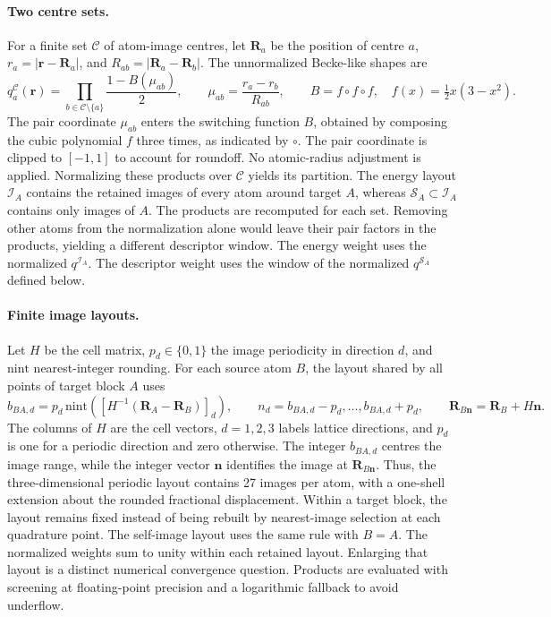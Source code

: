 \documentclass[10pt,a4paper]{article}
\begin{document}
\paragraph{Two centre sets.}
For a finite set $\mathcal C$ of atom-image centres, let $\mathbf R_a$ be the position of centre $a$, $r_a=|\mathbf r-\mathbf R_a|$, and $R_{ab}=|\mathbf R_a-\mathbf R_b|$. The unnormalized Becke-like shapes are
\begin{equation}
 q_a^{\mathcal C}(\mathbf r)=\prod_{b\in\mathcal C\setminus\{a\}}
 \frac{1-B(\mu_{ab})}{2},\qquad
 \mu_{ab}=\frac{r_a-r_b}{R_{ab}},\qquad
 B=f\circ f\circ f,\quad f(x)=\tfrac12x(3-x^2).
 \label{eq:partition-shapes}
\end{equation}
The pair coordinate $\mu_{ab}$ enters the switching function $B$, obtained by composing the cubic polynomial $f$ three times, as indicated by $\circ$.
The pair coordinate is clipped to $[-1,1]$ to account for roundoff. No atomic-radius adjustment is applied. Normalizing these products over $\mathcal C$ yields its partition. The energy layout $\mathcal I_A$ contains the retained images of every atom around target $A$, whereas $\mathcal S_A\subset\mathcal I_A$ contains only images of $A$. The products are recomputed for each set. Removing other atoms from the normalization alone would leave their pair factors in the products, yielding a different descriptor window. The energy weight uses the normalized $q^{\mathcal I_A}$. The descriptor weight uses the window of the normalized $q^{\mathcal S_A}$ defined below.

\paragraph{Finite image layouts.}
Let $H$ be the cell matrix, $p_d\in\{0,1\}$ the image periodicity in direction $d$, and $\mathrm{nint}$ nearest-integer rounding. For each source atom $B$, the layout shared by all points of target block $A$ uses
\begin{equation}
 b_{BA,d}=p_d\,\mathrm{nint}\!\left([H^{-1}(\mathbf R_A-\mathbf R_B)]_d\right),
 \qquad n_d=b_{BA,d}-p_d,\ldots,b_{BA,d}+p_d,
 \qquad \mathbf R_{B\mathbf n}=\mathbf R_B+H\mathbf n.
 \label{eq:partition-images}
\end{equation}
The columns of $H$ are the cell vectors, $d=1,2,3$ labels lattice directions, and $p_d$ is one for a periodic direction and zero otherwise. The integer $b_{BA,d}$ centres the image range, while the integer vector $\mathbf n$ identifies the image at $\mathbf R_{B\mathbf n}$.
Thus, the three-dimensional periodic layout contains 27 images per atom, with a one-shell extension about the rounded fractional displacement. Within a target block, the layout remains fixed instead of being rebuilt by nearest-image selection at each quadrature point. The self-image layout uses the same rule with $B=A$. The normalized weights sum to unity within each retained layout. Enlarging that layout is a distinct numerical convergence question. Products are evaluated with screening at floating-point precision and a logarithmic fallback to avoid underflow.
\end{document}
